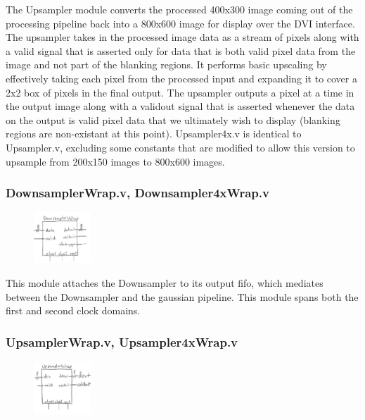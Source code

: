 \documentclass[12pt]{article}
\begin{document}
The Upsampler module converts the processed 400x300 image coming out of the processing
pipeline back into a 800x600 image for display over the DVI interface. The upsampler
takes in the processed image data as a stream of pixels along with a valid signal 
that is asserted only for data that is both valid pixel data from the image and
not part of the blanking regions. It performs basic upscaling by effectively taking
each pixel from the processed input and expanding it to cover a 2x2 box of 
pixels in the final output. The upsampler outputs a pixel at a time in the output 
image along with a validout signal that is asserted whenever the data on the 
output is valid pixel data that we ultimately wish to display (blanking regions
are non-existant at this point). Upsampler4x.v is identical to Upsampler.v, 
excluding some constants that are modified to allow this version to upsample 
from 200x150 images to 800x600 images.

\subsubsection{DownsamplerWrap.v, Downsampler4xWrap.v}

\begin{figure}
    \includegraphics[width=0.19\textwidth]{processed_image_pngs/black_box_modules/Downsamplerwrap_blackbox.png}
\end{figure}

This module attaches the Downsampler to its output fifo, which mediates between
the Downsampler and the gaussian pipeline. This module spans both the first
and second clock domains.

\subsubsection{UpsamplerWrap.v, Upsampler4xWrap.v}

\begin{figure}
    \includegraphics[width=0.19\textwidth]{processed_image_pngs/black_box_modules/Upsamplerwrap_blackbox.png}
\end{figure}
\end{document}
